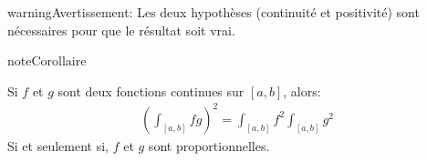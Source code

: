 \documentclass[letterpaper,10pt,french]{sphinxmanual}
\begin{document}
\begin{sphinxadmonition}{warning}{Avertissement:}
\sphinxAtStartPar
Les deux hypothèses (continuité et positivité) sont nécessaires pour que le résultat soit vrai.
\end{sphinxadmonition}

\begin{sphinxadmonition}{note}{Corollaire}

\sphinxAtStartPar
Si \(f\) et \(g\) sont deux fonctions continues sur \([a, b]\), alors:
\begin{equation*}
\begin{split}
\left (\int_{[a, b]}fg \right ) ^2 = \int_{[a, b]} f^2 \int_{[a, b]}g^2
\end{split}
\end{equation*}
\sphinxAtStartPar
Si et seulement si, \(f\) et \(g\) sont proportionnelles.
\end{sphinxadmonition}
\end{document}
